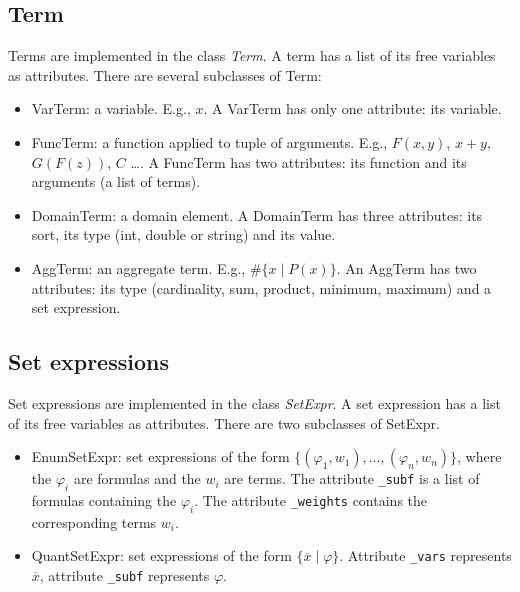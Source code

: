 \documentclass{article}
\begin{document}
\subsection*{Term}

Terms are implemented in the class \emph{Term}. A term has a list of its free variables as attributes. There are several subclasses of Term:
\begin{itemize}
	\item VarTerm: a variable. E.g., $x$. A VarTerm has only one attribute: its variable.
	\item FuncTerm: a function applied to tuple of arguments. E.g., $F(x,y)$, $x+y$, $G(F(z))$, $C$ \ldots. A FuncTerm has two attributes: its function and its arguments (a list of terms).
	\item DomainTerm: a domain element. A DomainTerm has three attributes: its sort, its type (int, double or string) and its value.
	\item AggTerm: an aggregate term. E.g., $\#\{ x \mid P(x) \}$. An AggTerm has two attributes: its type (cardinality, sum, product, minimum, maximum) and a set expression.
\end{itemize}

\subsection*{Set expressions}

Set expressions are implemented in the class \emph{SetExpr}. A set expression has a list of its free variables as attributes. There are two subclasses of SetExpr.
\begin{itemize}
	\item EnumSetExpr: set expressions of the form $\{ (\varphi_1,w_1), \ldots, (\varphi_n,w_n) \}$, where the $\varphi_i$ are formulas and the $w_i$ are terms. The attribute \texttt{\_subf} is a list of formulas containing the $\varphi_i$. The attribute \texttt{\_weights} contains the corresponding terms $w_i$.
	\item QuantSetExpr: set expressions of the form $\{ \overline{x} \mid \varphi \}$. Attribute \texttt{\_vars} represents $\overline{x}$, attribute \texttt{\_subf} represents $\varphi$.
\end{itemize}
\end{document}
